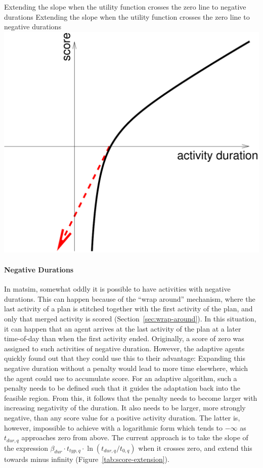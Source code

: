 \createfigure%
{Extending the slope when the utility function crosses the zero line to negative durations}%
{Extending the slope when the utility function crosses the zero line to negative durations}%
{\label{tab:score-extension}}%
{\includegraphics[width=0.4\hsize,trim=0 0 0 0,clip]{using/figures/score-extension}}%
{}

\paragraph*{Negative Durations}

In \gls{matsim}, somewhat oddly it is possible to have activities with negative durations. This can happen because of the ``wrap around'' mechanism, where the last activity of a plan is stitched together with the first activity of the plan, and only that merged activity is scored (\cf Section~\ref{sec:wrap-around}). 
In this situation,
it can happen that an agent arrives at the last activity of the plan at a later time-of-day than when the first activity ended.  Originally, a score of zero was assigned to such activities of negative duration. However, the adaptive agents quickly found out that they could use this to their advantage: Expanding this negative duration without a penalty would lead to more time elsewhere, which the agent could use to accumulate score. %
%
For an adaptive \gls{algorithm}, such a penalty needs to be defined such that it guides the adaptation back into the feasible region. From this, it follows that the penalty needs to become larger with increasing negativity of the duration. It also needs to be larger, \ie more strongly negative, than any score value for a positive activity duration.  The latter is, however, impossible to achieve with a logarithmic form which tends to $-\infty$ as $t_{dur,q}$ approaches zero from above. The current approach is to take the slope of the expression $\beta_{dur} \cdot t_{typ,q} \cdot \ln( t_{dur,q} / t_{0,q} )$ when it crosses zero, and extend this towards minus infinity (Figure~\ref{tab:score-extension}).

